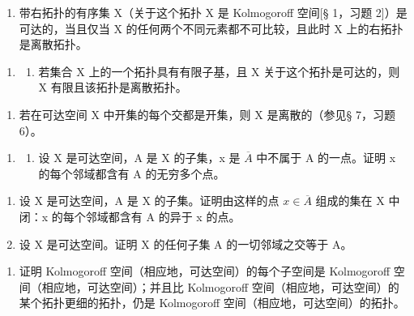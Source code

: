 \begin{enumerate}
\def\labelenumi{\alph{enumi})}
\setcounter{enumi}{1}
\tightlist
\item
  带右拓扑的有序集 X（关于这个拓扑 X 是 Kolmogoroff 空间{[}§ 1，习题 2{]}）是可达的，当且仅当 X 的任何两个不同元素都不可比较，且此时 X 上的右拓扑是离散拓扑。
\end{enumerate}

\begin{enumerate}
\def\labelenumi{\arabic{enumi})}
\setcounter{enumi}{1}
\tightlist
\item
  \begin{enumerate}
  \def\labelenumii{\alph{enumii})}
  \tightlist
  \item
    若集合 X 上的一个拓扑具有有限子基，且 X 关于这个拓扑是可达的，则 X 有限且该拓扑是离散拓扑。
  \end{enumerate}
\end{enumerate}

\begin{enumerate}
\def\labelenumi{\alph{enumi})}
\setcounter{enumi}{1}
\tightlist
\item
  若在可达空间 X 中开集的每个交都是开集，则 X 是离散的（参见§ 7，习题 6）。
\end{enumerate}

\begin{enumerate}
\def\labelenumi{\arabic{enumi})}
\setcounter{enumi}{2}
\tightlist
\item
  \begin{enumerate}
  \def\labelenumii{\alph{enumii})}
  \tightlist
  \item
    设 X 是可达空间，A 是 X 的子集，x 是 \(\overline{A}\) 中不属于 A 的一点。证明 x 的每个邻域都含有 A 的无穷多个点。
  \end{enumerate}
\end{enumerate}

\begin{enumerate}
\def\labelenumi{\alph{enumi})}
\setcounter{enumi}{1}
\item
  设 X 是可达空间，A 是 X 的子集。证明由这样的点 \(x \in \overline{A}\) 组成的集在 X 中闭：x 的每个邻域都含有 A 的异于 x 的点。
\item
  设 X 是可达空间。证明 X 的任何子集 A 的一切邻域之交等于 A。
\end{enumerate}

\begin{enumerate}
\def\labelenumi{\arabic{enumi})}
\setcounter{enumi}{3}
\tightlist
\item
  证明 Kolmogoroff 空间（相应地，可达空间）的每个子空间是 Kolmogoroff 空间（相应地，可达空间）；并且比 Kolmogoroff 空间（相应地，可达空间）的某个拓扑更细的拓扑，仍是 Kolmogoroff 空间（相应地，可达空间）的拓扑。
\end{enumerate}

